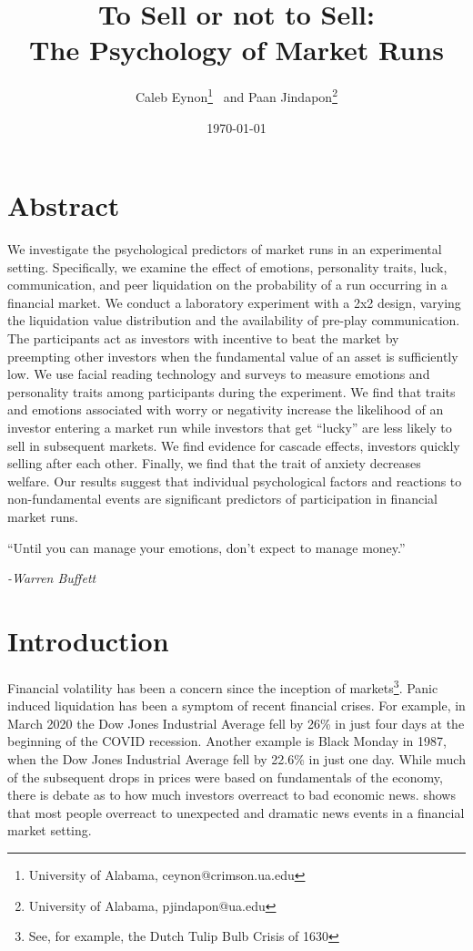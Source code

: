 \documentclass[11pt]{article}
\title{To Sell or not to Sell:\\ The Psychology of Market Runs%
}
\author{Caleb Eynon\thanks{University of Alabama, ceynon@crimson.ua.edu} 
~and  Paan Jindapon\thanks{University of Alabama, pjindapon@ua.edu}  }
\date{\today}
\begin{document}
\maketitle


\section*{\centering\textbf{Abstract}}
\noindent
\begin{singlespace}

\noindent
We investigate the psychological predictors of market runs in an experimental setting. Specifically, we examine the effect of emotions, personality traits, luck, communication, and peer liquidation on the probability of a run occurring in a financial market. We conduct a laboratory experiment with a 2x2 design, varying the liquidation value distribution and the availability of pre-play communication. The participants act as investors with incentive to beat the market by preempting other investors when the fundamental value of an asset is sufficiently low. We use facial reading technology and surveys to measure emotions and personality traits among participants during the experiment. We find that traits and emotions associated with worry or negativity increase the likelihood of an investor entering a market run while investors that get ``lucky'' are less likely to sell in subsequent markets. We find evidence for cascade effects, investors quickly selling after each other. Finally, we find that the trait of anxiety decreases welfare. Our results suggest that individual psychological factors and reactions to non-fundamental events are significant predictors of participation in financial market runs. 

\end{singlespace}
\newpage






\epigraph{``Until you can manage your emotions, don’t expect to manage money.''}{\textit{-Warren Buffett}}



\section{Introduction}

Financial volatility has been a concern since the inception of markets\footnote{See, for example, the Dutch Tulip Bulb Crisis of 1630}. Panic induced liquidation has been a symptom of recent financial crises. For example, in March 2020 the Dow Jones Industrial Average fell by 26\% in just four days at the beginning of the COVID recession. Another example is Black Monday in 1987, when the Dow Jones Industrial Average fell by 22.6\% in just one day. While much of the subsequent drops in prices were based on fundamentals of the economy, there is debate as to how much investors overreact to bad economic news. \cite{thaler1985} shows that most people overreact to unexpected and dramatic news events in a financial market setting. 
\end{document}
